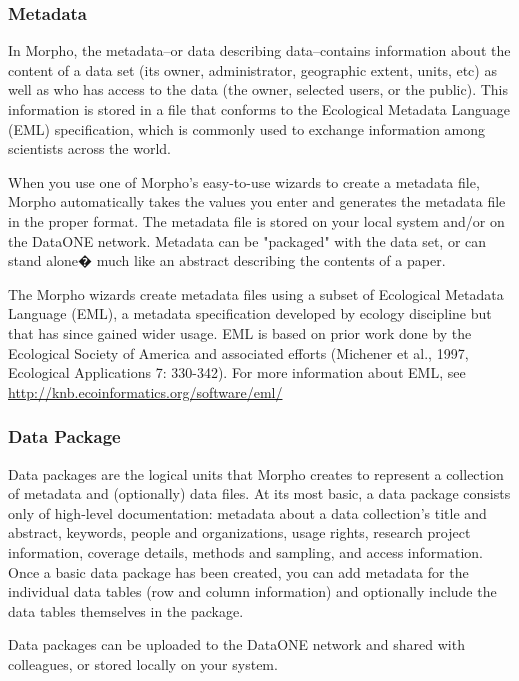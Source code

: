 \subsubsection{Metadata} \label{sec:metadata}

In Morpho, the metadata--or data describing data--contains information
about the content of a data set (its owner, administrator, geographic
extent, units, etc) as well as who has access to the data (the owner,
selected users, or the public). This information is stored in a file
that conforms to the Ecological Metadata Language (EML) specification,
which is commonly used to exchange information among scientists across
the world.

When you use one of Morpho's easy-to-use wizards to create a metadata
file, Morpho automatically takes the values you enter and generates the
metadata file in the proper format. The metadata file is stored on your
local system and/or on the DataONE network. Metadata can be "packaged" with
the data set, or can stand alone� much like an abstract describing the
contents of a paper. 

The Morpho wizards create metadata files using a subset of Ecological
Metadata Language (EML), a metadata specification developed by ecology
discipline but that has since gained wider usage. EML is based on prior
work done by the Ecological Society of America and associated efforts
(Michener et al., 1997, Ecological Applications 7: 330-342). For more
information about EML, see
\url{http://knb.ecoinformatics.org/software/eml/}


\subsubsection{Data Package} \label{sec:data package}

Data packages are the logical units that Morpho creates to represent a
collection of metadata and (optionally) data files. At its most basic, a
data package consists only of high-level documentation: metadata about a
data collection's title and abstract, keywords, people and
organizations, usage rights, research project information, coverage
details, methods and sampling, and access information. Once a basic data
package has been created, you can add metadata for the individual data
tables (row and column information) and optionally include the data
tables themselves in the package. 

Data packages can be uploaded to the DataONE network and shared with
colleagues, or stored locally on your system.

